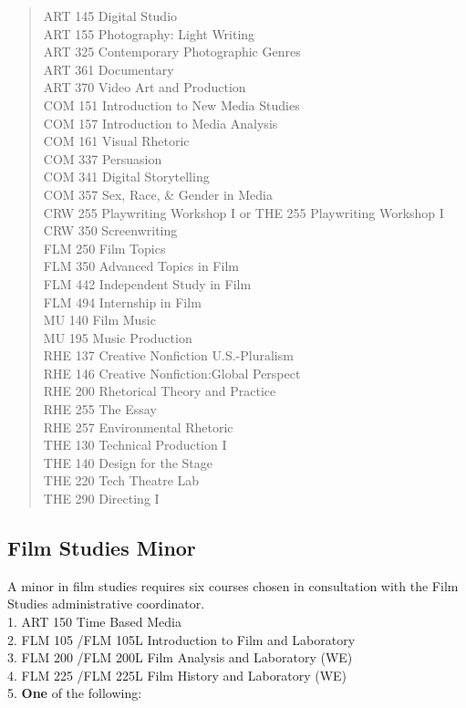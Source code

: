 \documentclass[
  letterpaper,
]{scrbook}
\begin{document}
\begin{quote}
ART 145 Digital Studio\\
ART 155 Photography: Light Writing\\
ART 325 Contemporary Photographic Genres\\
ART 361 Documentary\\
ART 370 Video Art and Production\\
COM 151 Introduction to New Media Studies\\
COM 157 Introduction to Media Analysis\\
COM 161 Visual Rhetoric\\
COM 337 Persuasion\\
COM 341 Digital Storytelling\\
COM 357 Sex, Race, \& Gender in Media\\
CRW 255 Playwriting Workshop I or THE 255 Playwriting Workshop I\\
CRW 350 Screenwriting\\
FLM 250 Film Topics\\
FLM 350 Advanced Topics in Film\\
FLM 442 Independent Study in Film\\
FLM 494 Internship in Film\\
MU 140 Film Music\\
MU 195 Music Production\\
RHE 137 Creative Nonfiction U.S.-Pluralism\\
RHE 146 Creative Nonfiction:Global Perspect\\
RHE 200 Rhetorical Theory and Practice\\
RHE 255 The Essay\\
RHE 257 Environmental Rhetoric\\
THE 130 Technical Production I\\
THE 140 Design for the Stage\\
THE 220 Tech Theatre Lab\\
THE 290 Directing I
\end{quote}

\subsection{Film Studies Minor}\label{film-studies-minor}

A minor in film studies requires six courses chosen in consultation with
the Film Studies administrative coordinator.\\
1. ART 150 Time Based Media\\
2. FLM 105 /FLM 105L Introduction to Film and Laboratory\\
3. FLM 200 /FLM 200L Film Analysis and Laboratory (WE)\\
4. FLM 225 /FLM 225L Film History and Laboratory (WE)\\
5. \textbf{One} of the following:
\end{document}
